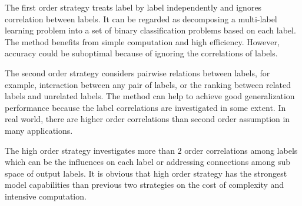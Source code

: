 The first order strategy treats label by label independently and ignores correlation between labels. It can be regarded as decomposing a multi-label learning problem into a set of binary classification problems based on each label. The method benefits from simple computation and high efficiency. However, accuracy could be suboptimal because of ignoring the correlations of labels.

The second order strategy considers pairwise relations between labels, for example, interaction between any pair of labels, or the ranking between related labels and unrelated labels. The method can help to achieve good generalization performance because the label correlations are investigated in some extent. In real world, there are higher order correlations than second order assumption in many applications.

The high order strategy investigates more than $2$ order correlations among labels which can be the influences on each label or addressing connections among sub space of output labels. It is obvious that high order strategy has the strongest model capabilities than previous two strategies on the cost of complexity and intensive computation.
